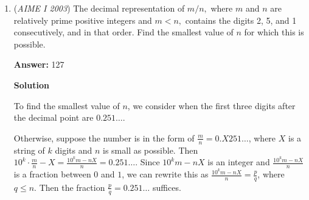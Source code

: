 \begin{enumerate}
 again by the Hockey Stick Identity. So we get

 $\binom{11}{6}+\binom{11}{7}+\binom{11}{8}+\binom{11}{9}+\binom{11}{10}+\binom{11}{11}=\frac{2^{11}}{2}=2^{10}=1024$.

 The total is $1024+175=1199$. Subtracting out the $44$ numbers between $2003$ and $2048$ gives $1155$. Thus the answer is $155$.

 



\textbf{Solution 3}

We will count the number of it $< 2^{11}=2048$ instead of $2003$ (In other words, the length of the base-2 representation is at most $11$. If there are even digits, $2n$, then the leftmost digit is $1$, the rest, $2n-1$, has odd number of digits. In order for the base-2 representation to have more $1$'s, we will need more $1$ in the remaining $2n-1$ than $0$'s. Using symmetry, this is equal to$\frac{2^9+2^7+..+2^1}{2}$Using similar argument where there are odd amount of digits. The remaining even amount of digit must contains the number of $1$'s at least as the number of $0$'s. So it's equal to$\frac{\binom{10}{5}+2^{10}+\binom{8}{4}+2^8+\binom{6}{3}+2^6+...+\binom{0}{0}+2^0}{2}$Summing both cases, we have $\frac{2^0+2^1+..+2^{10}+\binom{0}{0}+..+\binom{10}{5}}{2} = 199$. There are $44$ numbers between $2004$ and $2047$ inclusive that satisfy it. So the answer is $199-44=\boxed{155}$



	\item (\textit{AIME I 2003}) The decimal representation of $m/n,$ where $m$ and $n$ are relatively prime positive integers and $m < n,$ contains the digits 2, 5, and 1 consecutively, and in that order. Find the smallest value of $n$ for which this is possible.


 
 \textbf{Answer: }127



\textbf{Solution}

To find the smallest value of $n$, we consider when the first three digits after the decimal point are $0.251\ldots$. 

 
Otherwise, suppose the number is in the form of $\frac{m}{n} = 0.X251 \ldots$, where $X$ is a string of $k$ digits and $n$ is small as possible. Then $10^k \cdot \frac{m}{n} - X = \frac{10^k m - nX}{n} = 0.251 \ldots$. Since $10^k m - nX$ is an integer and $\frac{10^k m - nX}{n}$ is a fraction between $0$ and $1$, we can rewrite this as $\frac{10^k m - nX}{n} = \frac{p}{q}$, where $q \le n$. Then the fraction $\frac pq = 0.251 \ldots$ suffices. 


\end{enumerate}
